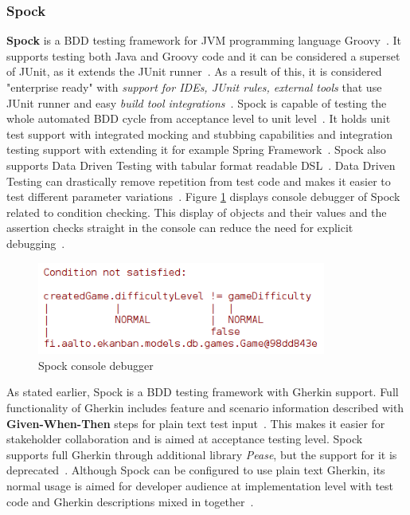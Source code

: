     \subsubsection{Spock}
    \textbf{Spock} is a BDD testing framework for JVM programming language Groovy~\cite{kapelonis2016java}. It supports
    testing both Java and Groovy code and it can be considered a superset of JUnit, as it extends the JUnit runner~\cite{spock}.
    As a result of this, it is considered "enterprise ready" with \textit{support for IDEs, JUnit rules, external tools} that use
    JUnit runner and easy \textit{build tool integrations}~\cite{kapelonis2016java}.
    Spock is capable of testing the whole automated BDD cycle from acceptance level to unit level~\cite{kapelonis2016java}.
    It holds unit test support with integrated mocking and stubbing capabilities and integration testing support with extending it for
    example Spring Framework~\cite{kapelonis2016java}. Spock also supports Data Driven Testing with tabular format readable DSL~\cite{spock}.
    Data Driven Testing can drastically remove repetition from test code and makes it easier to test different parameter
    variations~\cite{kapelonis2016java}. Figure \ref{fig:spock-debug} displays console debugger of Spock related to
    condition checking. This display of objects and their values and the assertion checks straight in the console
    can reduce the need for explicit debugging~\cite{kapelonis2016java}.
    \begin{figure}[ht]
      \begin{center}
        \includegraphics[width=9.5cm]{images/spock-debug.png}
        \caption{Spock console debugger}
        \label{fig:spock-debug}
      \end{center}
    \end{figure}

    As stated earlier, Spock is a BDD testing framework with Gherkin support.
    Full functionality of Gherkin includes feature and scenario information described
    with \textbf{Given-When-Then} steps for plain text test input~\cite{gherkin}. This makes it easier for stakeholder collaboration
    and is aimed at acceptance testing level.
    Spock supports full Gherkin through additional library \textit{Pease}, but the support for it is deprecated~\cite{spock-pease}.
    Although Spock can be configured to use plain text Gherkin, its normal usage is aimed for developer audience at implementation
    level with test code and Gherkin descriptions mixed in together~\cite{okolnychyi2016study}.

